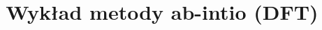 \documentclass[oneside,polish]{amsart}
\numberwithin{equation}{section}
\numberwithin{figure}{section}
\theoremstyle{plain}
\begin{document}
\title{Wykład metody ab-intio (DFT)}

\maketitle

\tableofcontents
\newpage


\newpage


\newpage


\newpage


\newpage


\newpage


\newpage


\newpage



\newpage



\newpage
\end{document}
